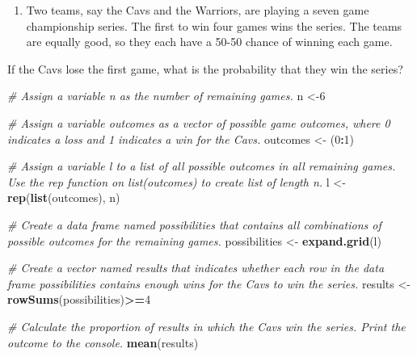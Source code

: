 \documentclass[
]{article}
\newenvironment{Shaded}{\begin{snugshade}}{\end{snugshade}}
\newcommand{\CommentTok}[1]{\textcolor[rgb]{0.56,0.35,0.01}{\textit{#1}}}
\newcommand{\DecValTok}[1]{\textcolor[rgb]{0.00,0.00,0.81}{#1}}
\newcommand{\KeywordTok}[1]{\textcolor[rgb]{0.13,0.29,0.53}{\textbf{#1}}}
\newcommand{\NormalTok}[1]{#1}
\newcommand{\OperatorTok}[1]{\textcolor[rgb]{0.81,0.36,0.00}{\textbf{#1}}}
\newcommand{\StringTok}[1]{\textcolor[rgb]{0.31,0.60,0.02}{#1}}
\providecommand{\tightlist}{%
  \setlength{\itemsep}{0pt}\setlength{\parskip}{0pt}}
\begin{document}
\begin{enumerate}
\def\labelenumi{\arabic{enumi}.}
\tightlist
\item
  Two teams, say the Cavs and the Warriors, are playing a seven game
  championship series. The first to win four games wins the series. The
  teams are equally good, so they each have a 50-50 chance of winning
  each game.
\end{enumerate}

If the Cavs lose the first game, what is the probability that they win
the series?

\begin{Shaded}
\begin{Highlighting}[]
\CommentTok{\# Assign a variable \textquotesingle{}n\textquotesingle{} as the number of remaining games.}
\NormalTok{n \textless{}{-}}\DecValTok{6}

\CommentTok{\# Assign a variable \textasciigrave{}outcomes\textasciigrave{} as a vector of possible game outcomes, where 0 indicates a loss and 1 indicates a win for the Cavs.}
\NormalTok{outcomes \textless{}{-}}\StringTok{ }\NormalTok{(}\DecValTok{0}\OperatorTok{:}\DecValTok{1}\NormalTok{)}

\CommentTok{\# Assign a variable \textasciigrave{}l\textasciigrave{} to a list of all possible outcomes in all remaining games. Use the \textasciigrave{}rep\textasciigrave{} function on \textasciigrave{}list(outcomes)\textasciigrave{} to create list of length \textasciigrave{}n\textasciigrave{}.}
\NormalTok{l \textless{}{-}}\StringTok{ }\KeywordTok{rep}\NormalTok{(}\KeywordTok{list}\NormalTok{(outcomes), n)}

\CommentTok{\# Create a data frame named \textquotesingle{}possibilities\textquotesingle{} that contains all combinations of possible outcomes for the remaining games.}
\NormalTok{possibilities \textless{}{-}}\StringTok{ }\KeywordTok{expand.grid}\NormalTok{(l)}

\CommentTok{\# Create a vector named \textquotesingle{}results\textquotesingle{} that indicates whether each row in the data frame \textquotesingle{}possibilities\textquotesingle{} contains enough wins for the Cavs to win the series.}
\NormalTok{results \textless{}{-}}\StringTok{ }\KeywordTok{rowSums}\NormalTok{(possibilities)}\OperatorTok{\textgreater{}=}\DecValTok{4}

\CommentTok{\# Calculate the proportion of \textquotesingle{}results\textquotesingle{} in which the Cavs win the series. Print the outcome to the console.}
\KeywordTok{mean}\NormalTok{(results)}
\end{Highlighting}
\end{Shaded}
\end{document}
